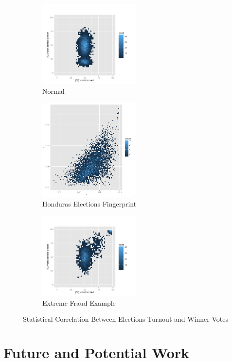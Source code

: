 \documentclass[letterpaper,10pt]{article}
\begin{document}
\begin{figure}
\centering
\begin{subfigure}{.3\textwidth}
  \centering
  \includegraphics[width=2in]{images/normal}
  \caption{Normal}
  \label{fig:normal}
\end{subfigure}%
\begin{subfigure}{.3\textwidth}
  \centering
  \includegraphics[width=2in]{images/fingerprint}
  \caption{Honduras Elections Fingerprint}
  \label{fig:fingerprint}
\end{subfigure}
\begin{subfigure}{.3\textwidth}
  \centering
  \includegraphics[width=2in]{images/extreme}
  \caption{Extreme Fraud Example}
  \label{fig:extreme}
\end{subfigure}

\caption{Statistical Correlation Between Elections Turnout and Winner Votes}
\label{fig:test}
\end{figure}


\section{Future and Potential Work}
\end{document}
